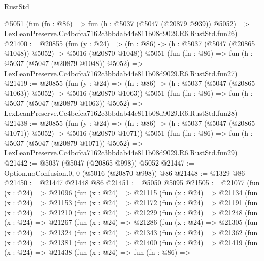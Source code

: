 \begin{lexlean}{RustStd}
\begin{coremodule}
    @5051
    (fun (fn : @86) =>
    fun (h : @5037 (@5047 (@20879 @939)) @5052) =>
    LexLeanPreserve.Cc4bcfca7162c3bbdab44e811b08d9029.R6.RustStd.fun26)
@21400 := @20855
    (fun (y : @24) =>
    (fn : @86) -> (h : @5037 (@5047 (@20865 @1048)) @5052) -> @5016 (@20870 @1048))
    @5051
    (fun (fn : @86) =>
    fun (h : @5037 (@5047 (@20879 @1048)) @5052) =>
    LexLeanPreserve.Cc4bcfca7162c3bbdab44e811b08d9029.R6.RustStd.fun27)
@21419 := @20855
    (fun (y : @24) =>
    (fn : @86) -> (h : @5037 (@5047 (@20865 @1063)) @5052) -> @5016 (@20870 @1063))
    @5051
    (fun (fn : @86) =>
    fun (h : @5037 (@5047 (@20879 @1063)) @5052) =>
    LexLeanPreserve.Cc4bcfca7162c3bbdab44e811b08d9029.R6.RustStd.fun28)
@21438 := @20855
    (fun (y : @24) =>
    (fn : @86) -> (h : @5037 (@5047 (@20865 @1071)) @5052) -> @5016 (@20870 @1071))
    @5051
    (fun (fn : @86) =>
    fun (h : @5037 (@5047 (@20879 @1071)) @5052) =>
    LexLeanPreserve.Cc4bcfca7162c3bbdab44e811b08d9029.R6.RustStd.fun29)
@21442 := @5037 (@5047 (@20865 @998)) @5052
@21447 := Option.noConfusion.{0, 0} (@5016 (@20870 @998)) @86
@21448 := @1329 @86
@21450 := @21447 @21448 @86
@21451 := @5050 @5095
@21505 := @21077
    (fun (x : @24) =>
    @21096
      (fun (x : @24) =>
      @21115
        (fun (x : @24) =>
        @21134
          (fun (x : @24) =>
          @21153
            (fun (x : @24) =>
            @21172
              (fun (x : @24) =>
              @21191
                (fun (x : @24) =>
                @21210
                  (fun (x : @24) =>
                  @21229
                    (fun (x : @24) =>
                    @21248
                      (fun (x : @24) =>
                      @21267
                        (fun (x : @24) =>
                        @21286
                          (fun (x : @24) =>
                          @21305
                            (fun (x : @24) =>
                            @21324
                              (fun (x : @24) =>
                              @21343
                                (fun (x : @24) =>
                                @21362
                                  (fun (x : @24) =>
                                  @21381
                                    (fun (x : @24) =>
                                    @21400
                                      (fun (x : @24) =>
                                      @21419
                                        (fun (x : @24) =>
                                        @21438
                                          (fun (x : @24) =>
                                          fun (fn : @86) =>

\end{coremodule}
\end{lexlean}
